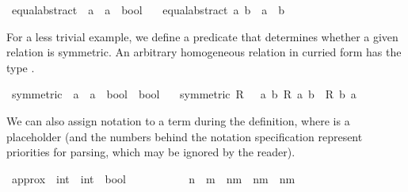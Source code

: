 \begin{isabellebody}
\isamarkupfalse%
\ equal{\isacharunderscore}{\kern0pt}abstract\ {\isacharcolon}{\kern0pt}{\isacharcolon}{\kern0pt}\ {\isacartoucheopen}{\isacharprime}{\kern0pt}a\ {\isasymRightarrow}\ {\isacharprime}{\kern0pt}a\ {\isasymRightarrow}\ bool{\isacartoucheclose}\isanewline
\ \ \ {\isacartoucheopen}equal{\isacharunderscore}{\kern0pt}abstract\ a\ b\ {\isasymequiv}\ a\ {\isacharequal}{\kern0pt}\ b{\isacartoucheclose}%
\begin{isamarkuptext}%
For a less trivial example, we define a predicate  that determines whether a given relation is symmetric. An arbitrary homogeneous relation in curried form has the type .%
\end{isamarkuptext}\isamarkuptrue%
\isamarkupfalse%
\ symmetric\ {\isacharcolon}{\kern0pt}{\isacharcolon}{\kern0pt}\ {\isacartoucheopen}{\isacharparenleft}{\kern0pt}{\isacharprime}{\kern0pt}a\ {\isasymRightarrow}\ {\isacharprime}{\kern0pt}a\ {\isasymRightarrow}\ bool{\isacharparenright}{\kern0pt}\ {\isasymRightarrow}\ bool{\isacartoucheclose}\isanewline
\ \ \ {\isacartoucheopen}symmetric\ R\ {\isasymequiv}\ {\isasymforall}\ a\ b{\isachardot}{\kern0pt}\ R\ a\ b\ {\isasymlongrightarrow}\ R\ b\ a{\isacartoucheclose}%
\begin{isamarkuptext}%
We can also assign notation to a term during the definition, where \isa{{\isacharunderscore}{\kern0pt}} is a placeholder (and the numbers behind the notation specification represent priorities for parsing, which may be ignored by the reader).%
\end{isamarkuptext}\isamarkuptrue%
\isamarkupfalse%
\ approx\ {\isacharcolon}{\kern0pt}{\isacharcolon}{\kern0pt}\ {\isacartoucheopen}int\ {\isasymRightarrow}\ int\ {\isasymRightarrow}\ bool{\isacartoucheclose}\isanewline
\ \ {\isacharparenleft}{\kern0pt}{\isacartoucheopen}{\isacharunderscore}{\kern0pt}\ {\isasymapprox}\ {\isacharunderscore}{\kern0pt}{\isacartoucheclose}\ {\isacharbrackleft}{\kern0pt}{}{}{\isacharcomma}{\kern0pt}\ {}{}{\isacharbrackright}{\kern0pt}\ {}{}{\isacharparenright}{\kern0pt}\isanewline
\ \ \ {\isacartoucheopen}n\ {\isasymapprox}\ m\ {\isasymequiv}\ n{\isacharequal}{\kern0pt}m{\isacharminus}{\kern0pt}{}\ {\isasymor}\ n{\isacharequal}{\kern0pt}m\ {\isasymor}\ n{\isacharequal}{\kern0pt}m{\isacharplus}{\kern0pt}{}{\isacartoucheclose}%

\end{isabellebody}
